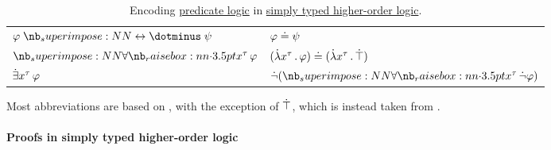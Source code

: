 \begin{definition}
\begin{table}
\begin{center}
\begin{tabular}{l l}
        \( \varphi \syniff \psi \)       & \( \varphi \doteq \psi \)                                                                                                                                                                                \\
        \( \qforall {x^\tau} \varphi \)  & \( (\qabs {x^\tau} \varphi) \syneq (\qabs {x^\tau} \syntop) \)                                                                                                                                           \\
        \( \qexists {x^\tau} \varphi \)  & \( \synneg (\qforall {x^\tau} \synneg \varphi) \)                                                                                                                                                        \\
        \bottomrule
      \end{tabular}
    \end{center}

    \caption{Encoding \hyperref[rem:predicate_logic]{predicate logic} in \hyperref[def:simply_typed_hol]{simply typed higher-order logic}.}\label{tab:def:simply_typed_hol_abbreviations}
  \end{table}
\end{definition}
\begin{comments}
  \item Most abbreviations are based on , with the exception of \( \dot{\top} \), which is instead taken from .
\end{comments}

\paragraph{Proofs in simply typed higher-order logic}

